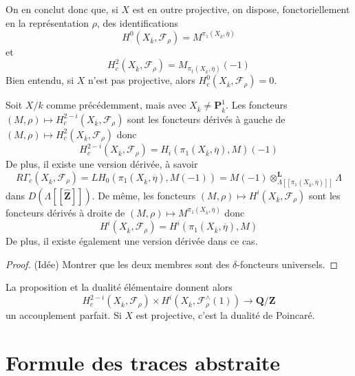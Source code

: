 \begin{remark}
\label{remark-projective}
On en conclut donc que, si $X$ est en outre projective,
on dispose, fonctoriellement en la représentation $\rho$,
des identifications
$$
H^0(X_{\overline{k}}, \mathcal{F}_\rho) =
M^{\pi_1(X_{\overline{k}}, \overline\eta)}
$$
et
$$
H_c^2(X_{\overline{k}}, \mathcal{F}_\rho) =
M_{\pi_1(X_{\overline{k}}, \overline \eta)}(-1)
$$
Bien entendu, si $X$ n'est pas projective, alors
$H^0_c(X_{\overline{k}}, \mathcal{F}_\rho) = 0$.
\end{remark}


\begin{proposition}
\label{proposition-curve-kpi1}
Soit $X/k$ comme précédemment, mais avec $X_{\overline{k}}\neq \mathbf{P}^1_{\overline{k}}$.
Les foncteurs
$
(M, \rho)\mapsto H_c^{2-i}(X_{\overline{k}}, \mathcal{F}_\rho)
$
sont les foncteurs dérivés à gauche de
$(M, \rho)\mapsto H_c^2(X_{\overline{k}}, \mathcal{F}_\rho)$
donc
$$
H_c^{2-i}(X_{\overline{k}}, \mathcal{F}_\rho) =
H_i(\pi_1(X_{\overline{k}}, \overline \eta), M)(-1)
$$
De plus, il existe une version dérivée, à savoir
$$
R\Gamma_c(X_{\overline{k}}, \mathcal{F}_\rho)
=
LH_0(\pi_1(X_{\overline{k}}, \overline \eta), M(-1))
=
M(-1)
\otimes_{\Lambda[[\pi_1(X_{\overline{k}}, \overline \eta)]]}^\mathbf{L}
\Lambda
$$
dans $D(\Lambda[[\widehat{\mathbf{Z}}]])$.
De même, les foncteurs
$(M, \rho)\mapsto H^i(X_{\overline{k}}, \mathcal{F}_\rho)$
sont les foncteurs dérivés à droite de
$(M, \rho)\mapsto M^{\pi_1(X_{\overline{k}}, \overline \eta)}$
donc
$$
H^i(X_{\overline{k}}, \mathcal{F}_\rho) =
H^i(\pi_1(X_{\overline{k}}, \overline \eta), M)
$$
De plus, il existe également une version dérivée dans ce cas.
\end{proposition}

\begin{proof}
(Idée) Montrer que les deux membres sont des $\delta$-foncteurs universels.
\end{proof}

\begin{remark}
\label{remark-poincare-groups}
La proposition et la dualité élémentaire donnent alors
$$
H^{2-i}_c(X_{\overline{k}}, \mathcal{F}_\rho)
\times
H^i(X_{\overline{k}}, \mathcal{F}_\rho^\wedge(1))
\to
\mathbf{Q}/\mathbf{Z}
$$
un accouplement parfait. Si $X$ est projective, c'est la dualité de Poincaré.
\end{remark}





\section{Formule des traces abstraite}
\label{section-abstract-trace-formula}

